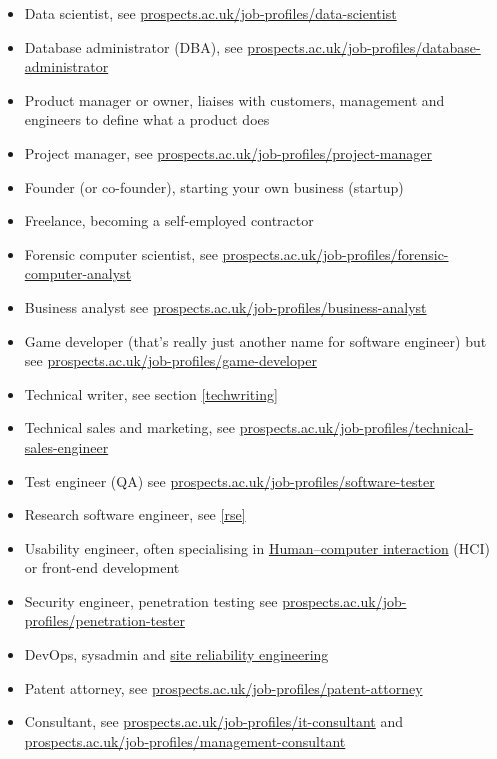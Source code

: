 \documentclass[
]{book}
\providecommand{\tightlist}{%
  \setlength{\itemsep}{0pt}\setlength{\parskip}{0pt}}
\begin{document}
\begin{itemize}
\tightlist
\item
  Data scientist, see \href{https://www.prospects.ac.uk/job-profiles/data-scientist}{prospects.ac.uk/job-profiles/data-scientist}
\item
  Database administrator (DBA), see \href{https://www.prospects.ac.uk/job-profiles/database-administrator}{prospects.ac.uk/job-profiles/database-administrator}
\item
  Product manager or owner, liaises with customers, management and engineers to define what a product does
\item
  Project manager, see \href{https://www.prospects.ac.uk/job-profiles/project-manager}{prospects.ac.uk/job-profiles/project-manager}
\item
  Founder (or co-founder), starting your own business (startup)
\item
  Freelance, becoming a self-employed contractor
\item
  Forensic computer scientist, see \href{https://www.prospects.ac.uk/job-profiles/forensic-computer-analyst}{prospects.ac.uk/job-profiles/forensic-computer-analyst}
\item
  Business analyst see \href{https://www.prospects.ac.uk/job-profiles/business-analyst}{prospects.ac.uk/job-profiles/business-analyst}
\item
  Game developer (that's really just another name for software engineer) but see \href{https://www.prospects.ac.uk/job-profiles/game-developer}{prospects.ac.uk/job-profiles/game-developer}
\item
  Technical writer, see section \ref{techwriting}
\item
  Technical sales and marketing, see \href{https://www.prospects.ac.uk/job-profiles/technical-sales-engineer}{prospects.ac.uk/job-profiles/technical-sales-engineer}
\item
  Test engineer (QA) see \href{https://www.prospects.ac.uk/job-profiles/software-tester}{prospects.ac.uk/job-profiles/software-tester}
\item
  Research software engineer, see \ref{rse}
\item
  Usability engineer, often specialising in \href{https://en.wikipedia.org/wiki/Human\%E2\%80\%93computer_interaction}{Human--computer interaction} (HCI) or front-end development
\item
  Security engineer, penetration testing see \href{https://www.prospects.ac.uk/job-profiles/penetration-tester}{prospects.ac.uk/job-profiles/penetration-tester}
\item
  DevOps, sysadmin and \href{https://en.wikipedia.org/wiki/Site_reliability_engineering}{site reliability engineering}
\item
  Patent attorney, see \href{https://www.prospects.ac.uk/job-profiles/patent-attorney}{prospects.ac.uk/job-profiles/patent-attorney}
\item
  Consultant, see \href{https://www.prospects.ac.uk/job-profiles/it-consultant}{prospects.ac.uk/job-profiles/it-consultant} and \href{https://www.prospects.ac.uk/job-profiles/management-consultant}{prospects.ac.uk/job-profiles/management-consultant}
\end{itemize}
\end{document}
